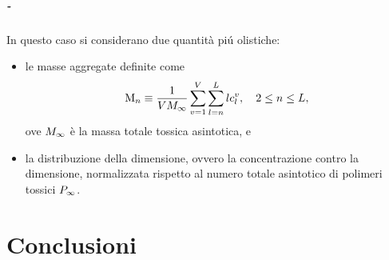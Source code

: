 \documentclass[11pt]{beamer}
\begin{document}
            \begin{frame}\frametitle{\insertpart{} - \insertsection{}}
                In questo caso si considerano due quantità piú olistiche:

                \begin{itemize}[%
                    leftmargin=20pt,  %
                    rightmargin=0pt,  %
                ] %
                    \item le masse aggregate definite come
                          \begin{equation*}
                              \text{M}_n\equiv\frac1{VM_\infty}\sum_{v=1}^V\sum_{l=n}^L
                              lc_l^v,\quad2\le n\le L,
                              \label{eqAggregateMass}
                          \end{equation*}
                          ove $M_\infty$ è la massa totale tossica asintotica, e
                    \item la distribuzione della dimensione, ovvero la concentrazione contro la dimensione, normalizzata rispetto al numero totale asintotico di polimeri tossici $P_\infty$.
                \end{itemize}
            \end{frame}

            




    \part{Conclusioni}
\end{document}
